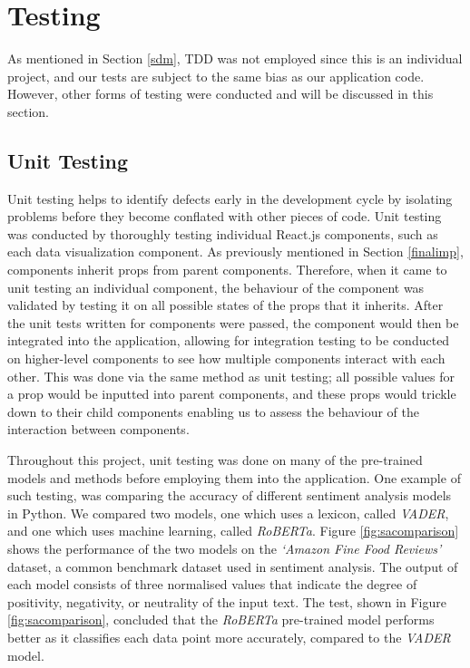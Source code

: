 \documentclass[12pt, a4paper]{article}
\newcommand{\np}
    {
    \vskip 0.4cm
    }
\begin{document}

\clearpage
\section{Testing}
\label{testing}

As mentioned in Section \ref{sdm}, TDD was not employed since this is an individual project, and our tests are subject to the same bias as our application code. However, other forms of testing were conducted and will be discussed in this section.

\subsection{Unit Testing}
\label{ut}

Unit testing helps to identify defects early in the development cycle by isolating problems before they become conflated with other pieces of code. Unit testing was conducted by thoroughly testing individual React.js components, such as each data visualization component. As previously mentioned in Section \ref{finalimp}, components inherit props from parent components. Therefore, when it came to unit testing an individual component, the behaviour of the component was validated by testing it on all possible states of the props that it inherits. After the unit tests written for components were passed, the component would then be integrated into the application, allowing for integration testing to be conducted on higher-level components to see how multiple components interact with each other. This was done via the same method as unit testing; all possible values for a prop would be inputted into parent components, and these props would trickle down to their child components enabling us to assess the behaviour of the interaction between components.
\np
Throughout this project, unit testing was done on many of the pre-trained models and methods before employing them into the application. One example of such testing, was comparing the accuracy of different sentiment analysis models in Python. We compared two models, one which uses a lexicon, called \textit{VADER}, and one which uses machine learning, called \textit{RoBERTa}. Figure \ref{fig:sacomparison} shows the performance of the two models on the \textit{`Amazon Fine Food Reviews'} dataset, a common benchmark dataset used in sentiment analysis. The output of each model consists of three normalised values that indicate the degree of positivity, negativity, or neutrality of the input text. The test, shown in Figure \ref{fig:sacomparison}, concluded that the \textit{RoBERTa} pre-trained model performs better as it classifies each data point more accurately, compared to the \textit{VADER} model.
\end{document}
